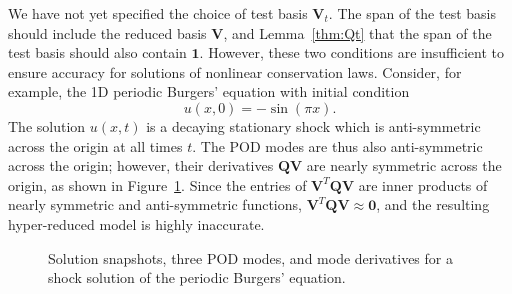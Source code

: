 \documentclass[preprint,10pt]{elsarticle}
\theoremstyle{definition}
\theoremstyle{lemma}
\theoremstyle{theorem}
\theoremstyle{assumption}
\newcommand{\bnote}[1]{{\color{blue}{#1}}}
\begin{document}
We have not yet specified the choice of test basis $\bm{V}_t$.  The span of the test basis should include the reduced basis $\bm{V}$, and Lemma~\ref{thm:Qt} \bnote{assumes} that the span of the test basis should also contain $\bm{1}$.  However, these two conditions are insufficient to ensure accuracy for solutions of nonlinear conservation laws.  Consider, for example, the 1D periodic Burgers' equation with initial condition 
\[
u(x,0) = -\sin(\pi x).
\]
The solution $u(x,t)$ is a decaying stationary shock which is anti-symmetric across the origin at all times $t$.  The POD modes are thus also anti-symmetric across the origin; however, their derivatives $\bm{Q}\bm{V}$ are nearly symmetric across the origin, as shown in Figure~\ref{fig:modeQ}.  Since the entries of $\bm{V}^T\bm{Q}\bm{V}$ are inner products of nearly symmetric and anti-symmetric functions, $\bm{V}^T\bm{Q}\bm{V} \approx \bm{0}$, and the resulting hyper-reduced model is highly inaccurate.
\begin{figure}[!h]
\centering
{}
\hspace{.1em}
\hspace{.1em}
\caption{Solution snapshots, three POD modes, and mode derivatives for a shock solution of the periodic Burgers' equation. }
\label{fig:modeQ}
\end{figure}
\end{document}
